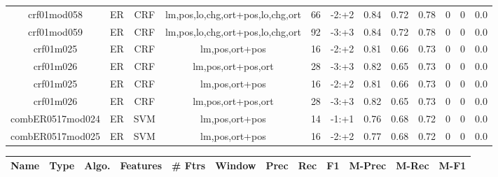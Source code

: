 \documentclass[a4paper]{article}
\begin{document}
\begin{landscape}
\begin{center}
\begin{tabular}{ |c|c|c|c|c|c|c|c|c|c|c|c|}
 	
 
 	
 		
 		\small{ crf01mod058 } & ER & CRF & lm,pos,lo,chg,ort+pos,lo,chg,ort  &  66 &  -2:+2  &  0.84 & 0.72 & 0.78  &  0 & 0 & 0.0 \\
 		

 	
 
 	
 		
 		\small{ crf01mod059 } & ER & CRF & lm,pos,lo,chg,ort+pos,lo,chg,ort  &  92 &  -3:+3  &  0.84 & 0.72 & 0.78  &  0 & 0 & 0.0 \\
 		

 	
 
 	
 		
 		\small{ crf01m025 } & ER & CRF & lm,pos,ort+pos  &  16 &  -2:+2  &  0.81 & 0.66 & 0.73  &  0 & 0 & 0.0 \\
 		

 	
 
 	
 		
 		\small{ crf01m026 } & ER & CRF & lm,pos,ort+pos,ort  &  28 &  -3:+3  &  0.82 & 0.65 & 0.73  &  0 & 0 & 0.0 \\
 		

 	
 
 	
 		
 		\small{ crf01m025 } & ER & CRF & lm,pos,ort+pos  &  16 &  -2:+2  &  0.81 & 0.66 & 0.73  &  0 & 0 & 0.0 \\
 		

 	
 
 	
 		
 		\small{ crf01m026 } & ER & CRF & lm,pos,ort+pos,ort  &  28 &  -3:+3  &  0.82 & 0.65 & 0.73  &  0 & 0 & 0.0 \\
 		

 	
 
 	
 		
 		\small{ combER0517mod024 } & ER & SVM & lm,pos,ort+pos  &  14 &  -1:+1  &  0.76 & 0.68 & 0.72  &  0 & 0 & 0.0 \\
 		

 	
 
 	
 		
 		\small{ combER0517mod025 } & ER & SVM & lm,pos,ort+pos  &  16 &  -2:+2  &  0.77 & 0.68 & 0.72  &  0 & 0 & 0.0 \\
 		
 \hline
\end{tabular}
\end{center}




\begin{center}
\begin{tabular}{ |c|c|c|c|c|c|c|c|c|c|c|c|} 
 \hline
 	Name & Type & Algo. & Features & \# Ftrs & Window & Prec & Rec & F1 & M-Prec & M-Rec & M-F1\\
 \hline


\end{tabular}
\end{center}
\end{landscape}
\end{document}
